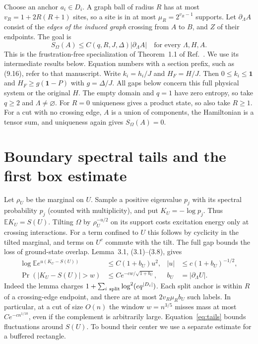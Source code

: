 \documentclass[aps,prb,onecolumn,10pt,nofootinbib]{revtex4-2}
\newcommand{\id}{\mathbf{1}}
\begin{document}
Choose an anchor $a_i\in D_i$. A graph ball of radius $R$ has at most $v_R=1+2R(R+1)$ sites, so a site is in at most $\mu_R=2^{v_R-1}$ supports. Let $\partial_\Lambda A$ consist of the \emph{edges of the induced graph} crossing from $A$ to $B$, and $Z$ of their endpoints. The goal is
\begin{equation}
 S_\Omega(A)\le C(q,R,J,\Delta)|\partial_\Lambda A|
 \quad\text{for every }\Lambda,H,A.
 \label{eq:goal}
\end{equation}
This is the frustration-free specialization of Theorem~1.1 of Ref.~\cite{area}. We use its intermediate results below. Equation numbers with a section prefix, such as (9.16), refer to that manuscript. Write $k_i=h_i/J$ and $H_F=H/J$. Then $0\le k_i\le\id$ and $H_F\ge g(\id-P)$ with $g=\Delta/J$. All gaps below concern this full physical system or the original $H$. The empty domain and $q=1$ have zero entropy, so take $q\ge2$ and $\Lambda\ne\varnothing$. For $R=0$ uniqueness gives a product state, so also take $R\ge1$. For a cut with no crossing edge, $A$ is a union of components, the Hamiltonian is a tensor sum, and uniqueness again gives $S_\Omega(A)=0$.

\section{Boundary spectral tails and the first box estimate}

Let $\rho_U$ be the marginal on $U$. Sample a positive eigenvalue $p_j$ with its spectral probability $p_j$ (counted with multiplicity), and put $K_U=-\log p_j$. Thus $\mathbb E K_U=S(U)$. Tilting $\Omega$ by $\rho_U^{-u/2}$ on its support costs excitation energy only at crossing interactions. For a term confined to $U$ this follows by cyclicity in the tilted marginal, and terms on $U^c$ commute with the tilt. The full gap bounds the loss of ground-state overlap. Lemma~3.1, (3.1)--(3.8), gives
\begin{align}
 \log\mathbb E e^{u(K_U-S(U))}&\le C(1+b_U)u^2,
 & |u|&\le c(1+b_U)^{-1/2}, \nonumber\\
 \Pr(|K_U-S(U)|>w)&\le C e^{-cw/\sqrt{1+b_U}},
 & b_U&=|\partial_\Lambda U|. \label{eq:tails}
\end{align}
Indeed the lemma charges $1+\sum_{i\ {\rm split}}\log^2(e q^{|D_i|})$. Each split anchor is within $R$ of a crossing-edge endpoint, and there are at most $2v_R\mu_R b_U$ such labels. In particular, at a cut of size $O(n)$ the window $w=n^{3/5}$ misses mass at most $Ce^{-c n^{1/10}}$, even if the complement is arbitrarily large. Equation~\eqref{eq:tails} bounds fluctuations around $S(U)$. To bound their center we use a separate estimate for a buffered rectangle.
\end{document}
